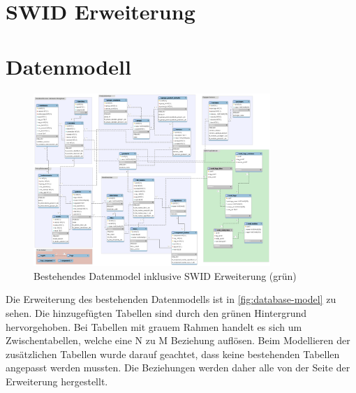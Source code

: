 \section{SWID Erweiterung}
\section{Datenmodell}
\begin{figure}[H]
\centering
\includegraphics[angle=90,width=0.8\textwidth]{./images/db/database-model}
\caption{Bestehendes Datenmodel inklusive SWID Erweiterung (grün)}
\label{fig:database-model}
\end{figure}
Die Erweiterung des bestehenden Datenmodells ist in \autoref{fig:database-model}
zu sehen. Die hinzugefügten Tabellen sind durch den grünen Hintergrund
hervorgehoben. Bei Tabellen mit grauem Rahmen handelt es sich um
Zwischentabellen, welche eine N zu M Beziehung auflösen. Beim Modellieren der
zusätzlichen Tabellen wurde darauf geachtet, dass keine bestehenden Tabellen
angepasst werden mussten. Die Beziehungen werden daher alle von der Seite der
Erweiterung hergestellt.
